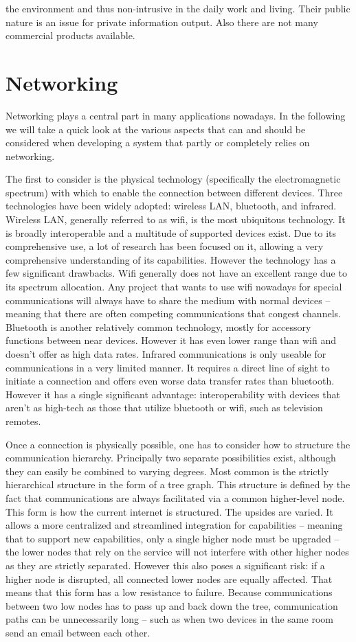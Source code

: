 \documentclass{acm_proc_article-sp}
\begin{document}
the environment and thus non-intrusive in the daily work and living. Their public nature is an issue for private information output. Also there are not many commercial products available.

\section{Networking}

Networking plays a central part in many applications nowadays.
In the following we will take a quick look at the various aspects that can and should be considered when developing a system that partly or completely relies on networking.

The first to consider is the physical technology (specifically the electromagnetic spectrum) with which to enable the connection between different devices.
Three technologies have been widely adopted: wireless LAN, bluetooth, and infrared.
Wireless LAN, generally referred to as wifi, is the most ubiquitous technology.
It is broadly interoperable and a multitude of supported devices exist.
Due to its comprehensive use, a lot of research has been focused on it, allowing a very comprehensive understanding of its capabilities.
However the technology has a few significant drawbacks.
Wifi generally does not have an excellent range due to its spectrum allocation.
Any project that wants to use wifi nowadays for special communications will always have to share the medium with normal devices – meaning that there are often competing communications that congest channels.
Bluetooth is another relatively common technology, mostly for accessory functions between near devices.
However it has even lower range than wifi and doesn’t offer as high data rates.
Infrared communications is only useable for communications in a very limited manner.
It requires a direct line of sight to initiate a connection and offers even worse data transfer rates than bluetooth.
However it has a single significant advantage: interoperability with devices that aren’t as high-tech as those that utilize bluetooth or wifi, such as television remotes.

Once a connection is physically possible, one has to consider how to structure the communication hierarchy.
Principally two separate possibilities exist, although they can easily be combined to varying degrees.
Most common is the strictly hierarchical structure in the form of a tree graph.
This structure is defined by the fact that communications are always facilitated via a common higher-level node.
This form is how the current internet is structured.
The upsides are varied.
It allows a more centralized and streamlined integration for capabilities – meaning that to support new capabilities, only a single higher node must be upgraded – the lower nodes that rely on the service will not interfere with other higher nodes as they are strictly separated.
However this also poses a significant risk: if a higher node is disrupted, all connected lower nodes are equally affected.
That means that this form has a low resistance to failure.
Because communications between two low nodes has to pass up and back down the tree, communication paths can be unnecessarily long – such as when two devices in the same room send an email between each other.
\end{document}
